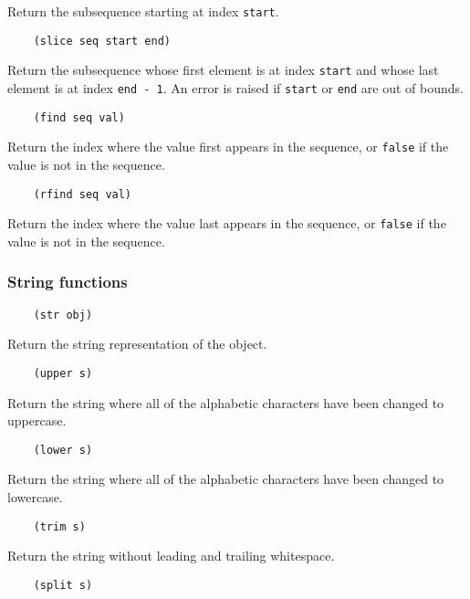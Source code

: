 \documentclass{article}
\newcommand{\inlinecode}{\texttt}
\begin{document}
Return the subsequence starting at index \inlinecode{start}.

\begin{verbatim}
    (slice seq start end)
\end{verbatim}

Return the subsequence whose first element is at index \inlinecode{start} and whose last element is at index \inlinecode{end - 1}. An error is raised if \inlinecode{start} or \inlinecode{end} are out of bounds.

\begin{verbatim}
    (find seq val)
\end{verbatim}

Return the index where the value first appears in the sequence, or \inlinecode{false} if the value is not in the sequence.

\begin{verbatim}
    (rfind seq val)
\end{verbatim}

Return the index where the value last appears in the sequence, or \inlinecode{false} if the value is not in the sequence.

\subsubsection{String functions}
\begin{verbatim}
    (str obj)
\end{verbatim}

Return the string representation of the object.

\begin{verbatim}
    (upper s)
\end{verbatim}

Return the string where all of the alphabetic characters have been changed to uppercase.

\begin{verbatim}
    (lower s)
\end{verbatim}

Return the string where all of the alphabetic characters have been changed to lowercase.

\begin{verbatim}
    (trim s)
\end{verbatim}

Return the string without leading and trailing whitespace.

\begin{verbatim}
    (split s)
\end{verbatim}
\end{document}
